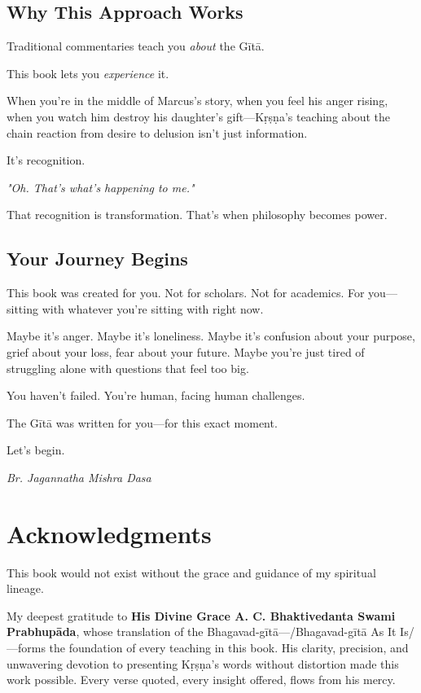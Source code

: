 \documentclass[11pt,twoside]{book}
\begin{document}
\section*{Why This Approach Works}

Traditional commentaries teach you \textit{about} the Gītā.

This book lets you \textit{experience} it.

When you're in the middle of Marcus's story, when you feel his anger rising, when you watch him destroy his daughter's gift—Kṛṣṇa's teaching about the chain reaction from desire to delusion isn't just information.

It's recognition.

\textit{"Oh. That's what's happening to me."}

That recognition is transformation. That's when philosophy becomes power.

\section*{Your Journey Begins}

This book was created for you. Not for scholars. Not for academics. For you—sitting with whatever you're sitting with right now.

Maybe it's anger. Maybe it's loneliness. Maybe it's confusion about your purpose, grief about your loss, fear about your future. Maybe you're just tired of struggling alone with questions that feel too big.

You haven't failed. You're human, facing human challenges.

The Gītā was written for you—for this exact moment.

Let's begin.

\vspace{0.5cm}

\begin{flushright}
\textit{Br. Jagannatha Mishra Dasa}
\end{flushright}

\chapter*{Acknowledgments}
\pagestyle{frontmatter}

This book would not exist without the grace and guidance of my spiritual lineage.

My deepest gratitude to \textbf{His Divine Grace A. C. Bhaktivedanta Swami Prabhupāda}, whose translation of the Bhagavad-gītā—/Bhagavad-gītā As It Is/—forms the foundation of every teaching in this book. His clarity, precision, and unwavering devotion to presenting Kṛṣṇa's words without distortion made this work possible. Every verse quoted, every insight offered, flows from his mercy.
\end{document}
